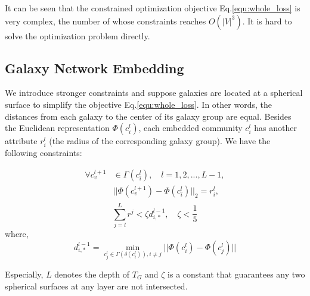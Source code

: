 \documentclass{article}
\theoremstyle{definition}
\begin{document}
		It can be seen that the constrained optimization objective Eq.\ref{equ:whole_loss} is very complex, the number of whose constraints reaches $O (|V|^3) $. It is hard to solve the optimization problem directly.

	 \subsection{Galaxy Network Embedding}
	 We introduce stronger constraints and suppose galaxies are located at a spherical surface to simplify the objective Eq.\ref{equ:whole_loss}. In other words, the distances from each galaxy to the center of its galaxy group are equal. Besides the Euclidean representation $\Phi(c_i^l)$, each embedded community $c_i^l$ has another attribute $r_i^l$ (the radius of the corresponding galaxy group).
	 We have the following constraints:

	 \begin{equation}
	 \begin{split}
	 	\label{equ:sphere_constraints}
	 	\forall c_v^{l+1} & \in \Gamma(c_i^l), \quad l = 1, 2, ..., L - 1,\\
	 	& ||\Phi(c_v^{l+1})  - \Phi(c_i^l)||_2= r_i^l, \\	
	 \end{split}
	 \end{equation}
	 \begin{equation}
	 \label{equ:galaxy_constraints}
	 	\sum_{j=l}^L r^j < \zeta d^{l-1}_{i, *}, \quad \zeta < \frac{1}{5}	 	
	 \end{equation}
	 where,
	 \[
	 d_{i, *}^{l-1} = \min_{c_j^l \in \Gamma(\delta(c_i^l)), i \neq j} ||\Phi(c_i^l)-\Phi(c_j^l)||
	 \]

	 Especially, $L$ denotes the depth of $T_G$ and $\zeta$ is a constant that guarantees any two spherical surfaces at any layer are not intersected.
\end{document}
